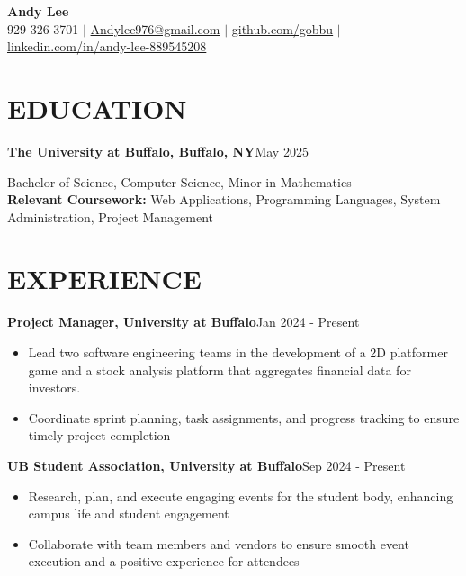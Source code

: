 \documentclass[11pt,letterpaper]{article}
\newcommand{\jobtitle}[2]{%
  \noindent\textbf{#1}\hfill{#2}\par
}
\newcommand{\jobrole}[1]{%
  \noindent{#1}\par\vspace{0pt}
}
\begin{document}

\begin{center}
    \textbf{\Large Andy Lee}\\
    \vspace{0.1cm}
    929-326-3701 $|$ \href{mailto:Andylee976@gmail.com}{Andylee976@gmail.com} $|$ 
    \href{https://github.com/gobbu}{github.com/gobbu} $|$ 
    \href{https://www.linkedin.com/in/andy-lee-889545208}{linkedin.com/in/andy-lee-889545208}
\end{center}

\section*{EDUCATION}
\jobtitle{The University at Buffalo, Buffalo, NY}{May 2025}
\noindent Bachelor of Science, Computer Science, Minor in Mathematics\\
\textbf{Relevant Coursework:} Web Applications, Programming Languages, System Administration, Project Management

\section*{EXPERIENCE}
\jobtitle{Project Manager, University at Buffalo}{Jan 2024 - Present}
\begin{itemize}
    \item Lead two software engineering teams in the development of a 2D platformer game and a stock analysis platform that aggregates financial data for investors.
    \item Coordinate sprint planning, task assignments, and progress tracking to ensure timely project completion
\end{itemize}

\jobtitle{UB Student Association, University at Buffalo}{Sep 2024 - Present}
\jobrole{Programming Staff Member}
\begin{itemize}
    \item Research, plan, and execute engaging events for the student body, enhancing campus life and student engagement
    \item Collaborate with team members and vendors to ensure smooth event execution and a positive experience for attendees
\end{itemize}

%
\end{document}

